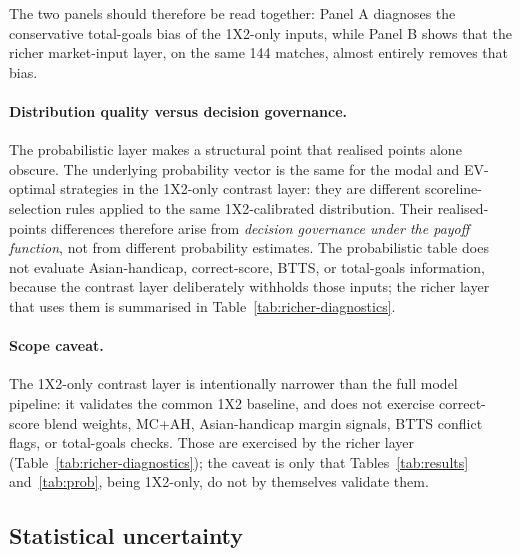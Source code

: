 \documentclass[11pt]{article}
\begin{document}
The two panels should therefore be read together: Panel A diagnoses the conservative
total-goals bias of the 1X2-only inputs, while Panel B shows that the richer market-input layer, on the same 144 matches, almost entirely removes that bias.

\paragraph{Distribution quality versus decision governance.} The probabilistic layer makes a
structural point that realised points alone obscure. The underlying probability vector is the same for the modal and EV-optimal strategies in the 1X2-only contrast layer: they are different scoreline-selection rules applied to the same 1X2-calibrated distribution. Their realised-points differences therefore arise from \emph{decision governance under the payoff function}, not from different probability estimates. The probabilistic table does not evaluate Asian-handicap, correct-score, BTTS, or total-goals information, because the contrast layer deliberately withholds those inputs; the richer layer that uses them is summarised in Table~\ref{tab:richer-diagnostics}.

\paragraph{Scope caveat.} The 1X2-only contrast layer is intentionally narrower than the full model pipeline: it validates the common 1X2 baseline, and does not exercise correct-score blend weights, MC+AH, Asian-handicap margin signals, BTTS conflict flags, or total-goals checks. Those are exercised by the richer layer (Table~\ref{tab:richer-diagnostics}); the caveat is only that Tables~\ref{tab:results} and~\ref{tab:prob}, being 1X2-only, do not by themselves validate them.

\subsection{Statistical uncertainty}
\end{document}
